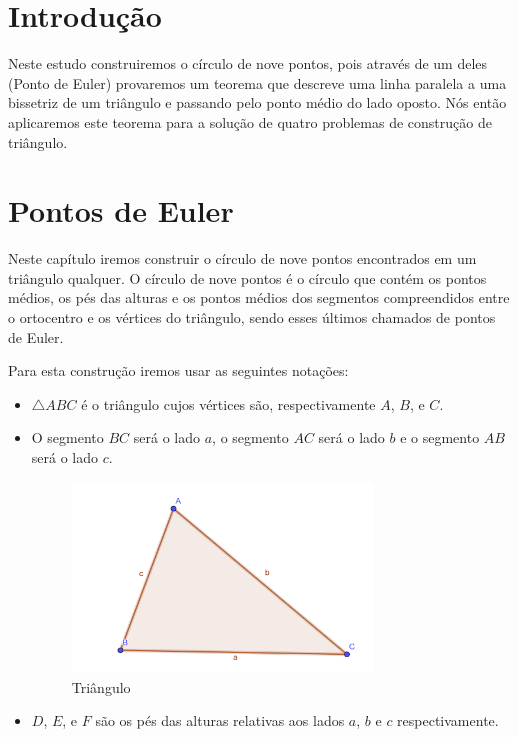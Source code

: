 \documentclass[12pt, openright, a4paper, brazil, openany, oneside]{abntex2}
\begin{document}


\frenchspacing 


\imprimircapa

\imprimirfolhaderosto*

\ABNTEXchapterfont

\tableofcontents*
\cleardoublepage
\textual

\chapter*[Introdução]{Introdução}


Neste estudo construiremos o círculo de nove pontos, pois através de um deles (Ponto de Euler) provaremos um teorema que descreve uma linha paralela a uma bissetriz de um triângulo e passando pelo ponto médio do lado oposto. Nós então aplicaremos este teorema para a solução de quatro problemas de construção de triângulo.



\chapter{Pontos de Euler}

Neste capítulo iremos construir o círculo de nove pontos encontrados em um triângulo qualquer. O círculo de nove pontos é o círculo que contém os pontos médios, os pés das alturas e os pontos médios dos segmentos compreendidos entre o ortocentro e os vértices do triângulo, sendo esses últimos chamados de pontos de Euler.

Para esta construção iremos usar as seguintes notações:

\begin{itemize}
\item $\triangle ABC$ é o triângulo cujos vértices são, respectivamente $A$, $B$, e $C$.
\item O segmento $BC$ será o lado $a$, o segmento $AC$ será o lado $b$ e o segmento $AB$ será o lado $c$.

\begin{figure}[h]

    \center

    \includegraphics[width=8cm]{triangulo1.png}
    \caption{Triângulo \label{tria1}}
    
\end{figure}

\item $D$, $E$, e $F$ são os pés das alturas relativas aos lados $a$, $b$ e $c$ respectivamente.


\end{itemize} 
\end{document}
